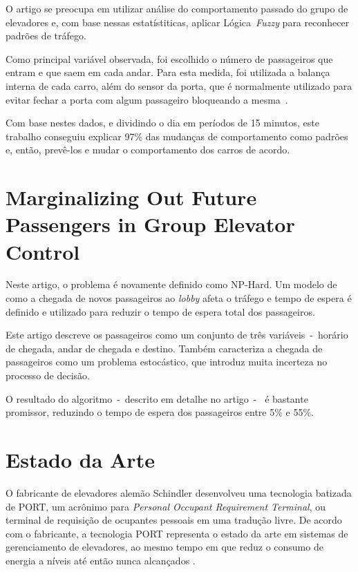 O artigo  se preocupa em utilizar análise do comportamento passado do grupo de
elevadores e, com base nessas estatístiticas, aplicar Lógica~\textit{Fuzzy} para
reconhecer padrões de tráfego.

Como principal variável observada, foi escolhido o número de passageiros que
entram e que saem em cada andar. Para esta medida, foi utilizada a balança
interna de cada carro, além do sensor da porta, que é normalmente utilizado para
evitar fechar a porta com algum passageiro bloqueando a mesma~\cite{marja97}.

Com base nestes dados, e dividindo o dia em períodos de 15 minutos, este
trabalho conseguiu explicar 97\% das mudanças de comportamento como padrões e,
então, prevê-los e mudar o comportamento dos carros de acordo.

\section{\label{section:dblp}Marginalizing Out Future Passengers in Group Elevator
Control~\cite{DBLP:journals/corr/abs-1212-2499}}

Neste artigo, o problema é novamente definido como NP-Hard. Um modelo de como a
chegada de novos passageiros ao \textit{lobby} afeta o tráfego e tempo de espera
é definido e utilizado para reduzir o tempo de espera total dos passageiros.

Este artigo descreve os passageiros como um conjunto de três variáveis~-~horário
de chegada, andar de chegada e destino. Também caracteriza a chegada de
passageiros como um problema estocástico, que introduz muita incerteza no
processo de decisão.

O resultado do algoritmo~-~descrito em detalhe no artigo~-~ é bastante
promissor, reduzindo o tempo de espera dos passageiros entre 5\% e 55\%.

\section{\label{section:art}Estado da Arte}

O fabricante de elevadores alemão Schindler desenvolveu uma tecnologia batizada
de PORT, um acrônimo para \textit{Personal Occupant Requirement Terminal}, ou
terminal de requisição de ocupantes pessoais em uma tradução livre. De acordo
com o fabricante, a tecnologia PORT representa o estado da arte em sistemas de
gerenciamento de elevadores, ao mesmo tempo em que reduz o consumo de energia a
níveis até então nunca alcançados \cite{Schindler14}.

